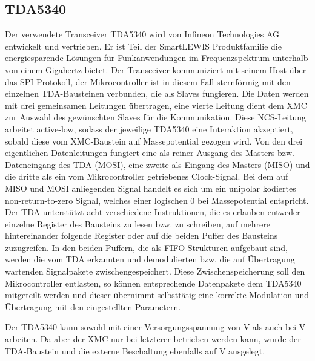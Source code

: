 \subsection{TDA5340}
Der verwendete Transceiver TDA5340 wird von Infineon Technologies AG  entwickelt und vertrieben. Er ist Teil der SmartLEWIS Produktfamilie die  energiesparende Lösungen für Funkanwendungen im Frequenzspektrum unterhalb von einem Gigahertz bietet. 
Der Transceiver kommuniziert mit seinem Host über das \ac{SPI}-Protokoll, der Mikrocontroller ist in diesem Fall sternförmig mit den einzelnen TDA-Bausteinen verbunden, die als Slaves fungieren. Die Daten werden mit drei gemeinsamen Leitungen übertragen, eine vierte Leitung dient dem XMC zur Auswahl des gewünschten Slaves für die Kommunikation. Diese \ac{NCS}-Leitung arbeitet active-low, sodass der jeweilige TDA5340 eine Interaktion akzeptiert, sobald diese vom XMC-Baustein auf Massepotential gezogen wird. Von den drei eigentlichen Datenleitungen fungiert eine als reiner Ausgang des Masters bzw. Dateneingang des TDA (\acs{MOSI}), eine zweite als Eingang des Masters (\acs{MISO}) und die dritte als ein vom Mikrocontroller getriebenes Clock-Signal. Bei dem auf \acs{MISO} und \acs{MOSI} anliegenden Signal handelt es sich um ein unipolar kodiertes non-return-to-zero Signal, welches einer logischen $0$ bei Massepotential entspricht. Der TDA unterstützt acht verschiedene Instruktionen, die es erlauben entweder einzelne Register des Bausteins zu lesen bzw. zu schreiben, auf mehrere hintereinander folgende Register  oder auf die beiden Puffer des Bausteins zuzugreifen. In den beiden Puffern, die als \ac{FIFO}-Strukturen  aufgebaut sind, werden die vom TDA erkannten und demodulierten bzw. die auf Übertragung wartenden Signalpakete zwischengespeichert. Diese Zwischenspeicherung soll den Mikrocontroller entlasten, so können entsprechende Datenpakete dem TDA5340 mitgeteilt werden und dieser übernimmt selbsttätig eine korrekte Modulation und Übertragung mit den eingestellten Parametern. 

Der TDA5340 kann sowohl mit einer Versorgungsspannung von \unit[5]{V} als auch bei \unit[3,3]{V} arbeiten. Da aber der XMC nur bei letzterer betrieben werden kann, wurde der TDA-Baustein und die externe Beschaltung ebenfalls auf  \unit[3,3]{V} ausgelegt. 




